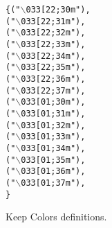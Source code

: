 \begin{footnotesize}\begin{alltt}
 \{ (\textcolor{stringliteral}{"\(\backslash\)033[22;30m"}), 
                                        (\textcolor{stringliteral}{"\(\backslash\)033[22;31m"}), 
                                        (\textcolor{stringliteral}{"\(\backslash\)033[22;32m"}), 
                                        (\textcolor{stringliteral}{"\(\backslash\)033[22;33m"}), 
                                        (\textcolor{stringliteral}{"\(\backslash\)033[22;34m"}), 
                                        (\textcolor{stringliteral}{"\(\backslash\)033[22;35m"}), 
                                        (\textcolor{stringliteral}{"\(\backslash\)033[22;36m"}), 
                                        (\textcolor{stringliteral}{"\(\backslash\)033[22;37m"}), 
                                        (\textcolor{stringliteral}{"\(\backslash\)033[01;30m"}), 
                                        (\textcolor{stringliteral}{"\(\backslash\)033[01;31m"}), 
                                        (\textcolor{stringliteral}{"\(\backslash\)033[01;32m"}),
                                        (\textcolor{stringliteral}{"\(\backslash\)033[01;33m"}),
                                        (\textcolor{stringliteral}{"\(\backslash\)033[01;34m"}),
                                        (\textcolor{stringliteral}{"\(\backslash\)033[01;35m"}),
                                        (\textcolor{stringliteral}{"\(\backslash\)033[01;36m"}),
                                        (\textcolor{stringliteral}{"\(\backslash\)033[01;37m"}),
    \}
\end{alltt}\end{footnotesize}


Keep Colors definitions. 

